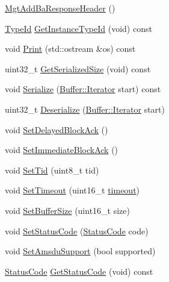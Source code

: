 \begin{DoxyCompactItemize}
\item 
\hyperlink{classns3_1_1MgtAddBaResponseHeader_a3b56cce5754e08ce8e80b60cea4b74cb}{Mgt\+Add\+Ba\+Response\+Header} ()
\item 
\hyperlink{classns3_1_1TypeId}{Type\+Id} \hyperlink{classns3_1_1MgtAddBaResponseHeader_ab4334fdf0cd7d5c60744a2542fba741c}{Get\+Instance\+Type\+Id} (void) const 
\item 
void \hyperlink{classns3_1_1MgtAddBaResponseHeader_a00bb472139add101421c3b5f03cb013a}{Print} (std\+::ostream \&os) const 
\item 
uint32\+\_\+t \hyperlink{classns3_1_1MgtAddBaResponseHeader_a2042de67096275eb6e016f49272e2d5c}{Get\+Serialized\+Size} (void) const 
\item 
void \hyperlink{classns3_1_1MgtAddBaResponseHeader_a64c18b13920615a98f0a4b15549d479d}{Serialize} (\hyperlink{classns3_1_1Buffer_1_1Iterator}{Buffer\+::\+Iterator} start) const 
\item 
uint32\+\_\+t \hyperlink{classns3_1_1MgtAddBaResponseHeader_ad4d932f7228397b260cb505033b14eca}{Deserialize} (\hyperlink{classns3_1_1Buffer_1_1Iterator}{Buffer\+::\+Iterator} start)
\item 
void \hyperlink{classns3_1_1MgtAddBaResponseHeader_ad9766d5b1d1126af95c6dbdc3ec367b5}{Set\+Delayed\+Block\+Ack} ()
\item 
void \hyperlink{classns3_1_1MgtAddBaResponseHeader_ae6633970c7242aa71b1fc61449624fac}{Set\+Immediate\+Block\+Ack} ()
\item 
void \hyperlink{classns3_1_1MgtAddBaResponseHeader_a09b380ccd07d4fb59a6300a325265a7e}{Set\+Tid} (uint8\+\_\+t tid)
\item 
void \hyperlink{classns3_1_1MgtAddBaResponseHeader_a6bcb6acdbb1cb9abb3b91beadda40da2}{Set\+Timeout} (uint16\+\_\+t \hyperlink{openflow-switch_8cc_a386d174ae121d1cfa279074b7e209714}{timeout})
\item 
void \hyperlink{classns3_1_1MgtAddBaResponseHeader_a7fae4569e8a6c0d210d1860c70b8e2f7}{Set\+Buffer\+Size} (uint16\+\_\+t size)
\item 
void \hyperlink{classns3_1_1MgtAddBaResponseHeader_a9d2c110b833396be651a392e93c24c13}{Set\+Status\+Code} (\hyperlink{classns3_1_1StatusCode}{Status\+Code} code)
\item 
void \hyperlink{classns3_1_1MgtAddBaResponseHeader_ac16b00127932b649f63eea6f8bf63071}{Set\+Amsdu\+Support} (bool supported)
\item 
\hyperlink{classns3_1_1StatusCode}{Status\+Code} \hyperlink{classns3_1_1MgtAddBaResponseHeader_a1c9d8038b6697a8a404c84f874a53ebf}{Get\+Status\+Code} (void) const 

\end{DoxyCompactItemize}

